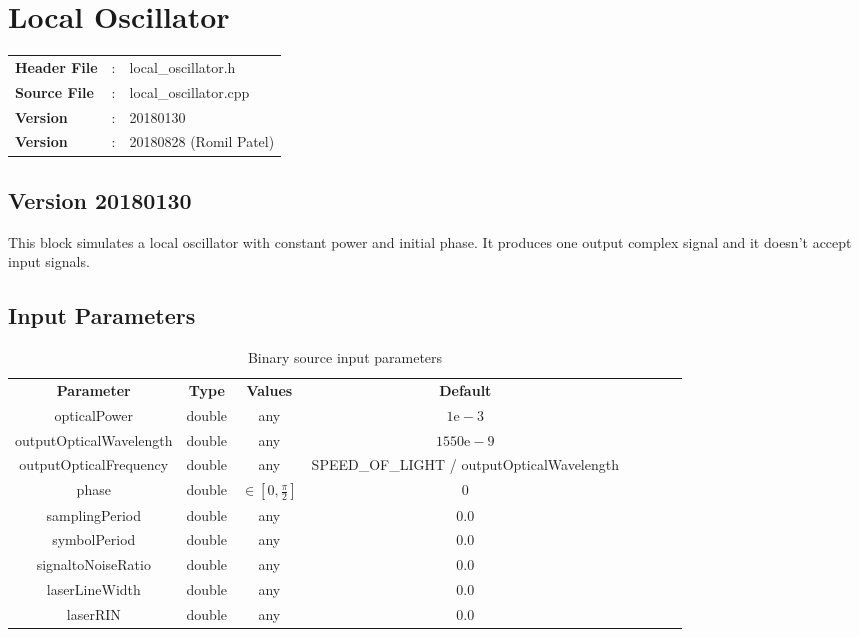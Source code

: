 \clearpage

\section{Local Oscillator}

\begin{tcolorbox}	
	\begin{tabular}{p{2.75cm} p{0.2cm} p{10.5cm}} 	
		\textbf{Header File}   &:& local\_oscillator.h \\
		\textbf{Source File}   &:& local\_oscillator.cpp \\
        \textbf{Version}       &:& 20180130\\
        \textbf{Version}       &:& 20180828 (Romil Patel)\\
	\end{tabular}
\end{tcolorbox}
\subsection*{Version 20180130}
This block simulates a local oscillator with constant power and initial phase. It produces one output complex signal and it doesn't accept input signals.

\subsection*{Input Parameters}

\begin{table}[h]
	\centering
	\begin{tabular}{|c|c|c|c|cccc}
		\cline{1-4}
		\textbf{Parameter} & \textbf{Type} & \textbf{Values} &   \textbf{Default}& \\ \cline{1-4}
		opticalPower & double & any & $1\text{e}-3$ \\ \cline{1-4}
		outputOpticalWavelength & double & any & $1550\text{e}-9$ \\ \cline{1-4}
		outputOpticalFrequency & double & any &  SPEED\_OF\_LIGHT / outputOpticalWavelength \\ \cline{1-4}
		phase & double & $\in \left[0,\frac{\pi}{2}\right]$ & $0$ \\ \cline{1-4}
		samplingPeriod & double & any & $0.0$ \\ \cline{1-4}
        symbolPeriod   & double & any & $0.0$ \\ \cline{1-4}
        signaltoNoiseRatio & double & any & $0.0$ \\ \cline{1-4}
        laserLineWidth & double & any & $0.0$ \\ \cline{1-4}
        laserRIN       & double & any & $0.0$ \\ \cline{1-4}
	\end{tabular}
	\caption{Binary source input parameters}
	\label{table:LO_in_par}
\end{table}

